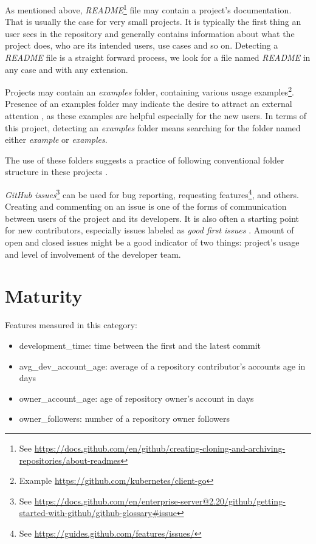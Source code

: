 As mentioned above, \emph{README}\footnote{See \url{https://docs.github.com/en/github/creating-cloning-and-archiving-repositories/about-readmes}} file may contain a project's documentation.
That is usually the case for very small projects.
It is typically the first thing an user sees in the repository and generally contains information about what the project does, who are its intended users, use cases and so on.
Detecting a \emph{README} file is a straight forward process, we look for a file named \emph{README} in any case and with any extension.

Projects may contain an \emph{examples} folder, containing various usage examples\footnote{Example \url{https://github.com/kubernetes/client-go}}.
Presence of an examples folder may indicate the desire to attract an external attention \cite{p:4}, as these examples are helpful especially for the new users.
In terms of this project, detecting an \emph{examples} folder means searching for the folder named either \emph{example} or \emph{examples}.

The use of these folders suggests a practice of following conventional folder structure in these projects \cite{p:4}.

\emph{GitHub issues}\footnote{See \url{https://docs.github.com/en/enterprise-server@2.20/github/getting-started-with-github/github-glossary\#issue}} can be used for bug reporting, requesting features\footnote{See \url{https://guides.github.com/features/issues/}}, and others.
Creating and commenting on an issue is one of the forms of communication between users of the project and its developers.
It is also often a starting point for new contributors, especially issues labeled as \emph{good first issues} \cite{newcomers}.
Amount of open and closed issues might be a good indicator of two things: project's usage and level of involvement of the developer team.

\section{Maturity}
\label{sec:maturity}

Features measured in this category:

\begin{itemize}
    \item development\_time: time between the first and the latest commit
    \item avg\_dev\_account\_age: average of a repository contributor's accounts age in days
    \item owner\_account\_age: age of repository owner's account in days
    \item owner\_followers: number of a repository owner followers
\end{itemize}

